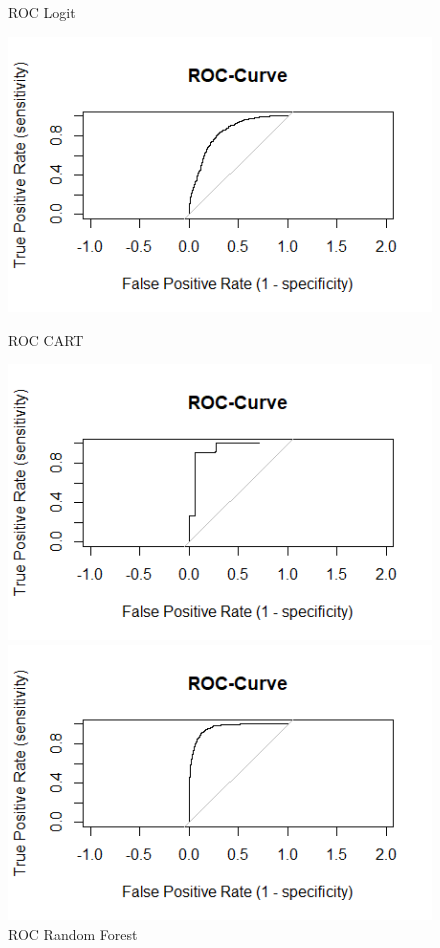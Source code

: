 \documentclass{article}
\begin{document}
\begin{figure}
\caption{ROC Logit}
\includegraphics[scale=.45]{../Evaluation/ROC-Curve_Logit.png}
\caption{ROC CART}
\includegraphics[scale=0.45]{../Evaluation/ROC-Curve_CART.png}
\caption{ROC Random Forest}
\includegraphics[scale=.45]{../Evaluation/ROC-Curve_Random-forest.png}
\end{figure}
\end{document}
